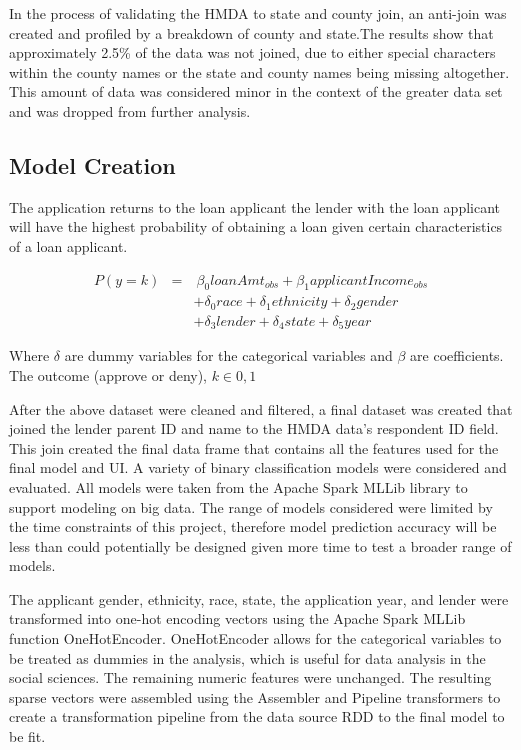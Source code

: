 \documentclass[conference,compsoc]{IEEEtran}
\begin{document}
In the process of validating the HMDA to state and county join, an anti-join was created and profiled by a breakdown of county and state.The results show that approximately 2.5\% of the data was not joined, due to either special characters within the county names or the state and county names being missing altogether. This amount of data was considered minor in the context of the greater data set and was dropped from further analysis.


\subsection{Model Creation}

The application returns to the loan applicant the lender with the loan applicant will have the highest probability of obtaining a loan given certain characteristics of a loan applicant.  

\begin{eqnarray*}
P(y=k) & = & \ \beta_0 loanAmt_{obs}  + \beta_1 applicantIncome_{obs} \\
& & + \delta_0 race + \delta_1 ethnicity  + \delta_2 gender  \\
& & + \delta_3 lender  +  \delta_4 state + \delta_5 year
\end{eqnarray*}

Where $\delta$ are dummy variables for the categorical variables and $\beta$ are coefficients. The outcome (approve or deny), $k \in 0,1$

 \vspace{5mm}

After the above dataset were cleaned and filtered, a final dataset was created that joined the lender parent ID and name to the HMDA data’s respondent ID field. This join created the final data frame that contains all the features used for the final model and UI.
A variety of binary classification models were considered and evaluated. All models were taken from the Apache Spark MLLib library to support modeling on big data. The range of models considered were limited by the time constraints of this project, therefore model prediction accuracy will be less than could potentially be designed given more time to test a broader range of models. 

The applicant gender, ethnicity, race, state, the application year, and lender were transformed into one-hot encoding vectors using the Apache Spark MLLib function OneHotEncoder.  OneHotEncoder allows for the categorical variables to be treated as dummies in the analysis, which is useful for data analysis in the social sciences.  The remaining numeric features were unchanged. The resulting sparse vectors were assembled using the Assembler and Pipeline transformers to create a transformation pipeline from the data source RDD to the final model to be fit. 
\end{document}
